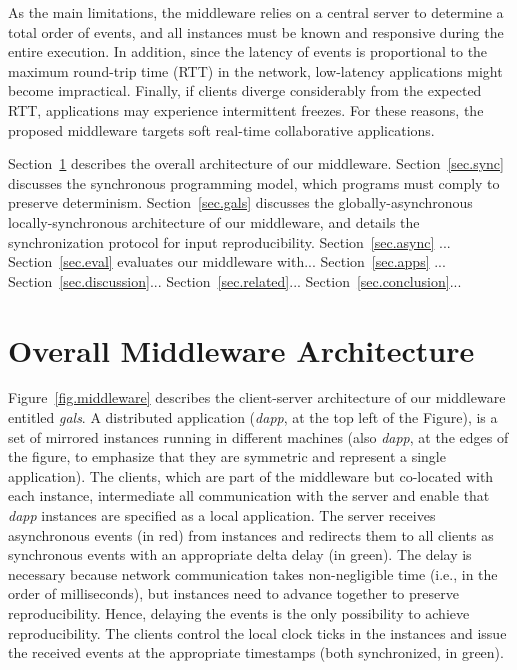 \documentclass[sigplan,screen]{acmart}
\newcommand{\dapp}{\emph{dapp}\xspace}
\begin{document}
As the main limitations, the middleware relies on a central server to determine
a total order of events, and all instances must be known and responsive during
the entire execution.
In addition, since the latency of events is proportional to the maximum
round-trip time (RTT) in the network, low-latency applications might become
impractical.
Finally, if clients diverge considerably from the expected RTT, applications
may experience intermittent freezes.
For these reasons, the proposed middleware targets soft real-time collaborative
applications.

Section~\ref{sec.arch} describes the overall architecture of our middleware.
Section~\ref{sec.sync} discusses the synchronous programming model, which
programs must comply to preserve determinism.
Section~\ref{sec.gals} discusses the globally-asynchronous locally-synchronous
architecture of our middleware, and details the synchronization protocol for
input reproducibility.
Section~\ref{sec.async} ...
Section~\ref{sec.eval} evaluates our middleware with...
Section~\ref{sec.apps} ... %
Section~\ref{sec.discussion}...
Section~\ref{sec.related}...
Section~\ref{sec.conclusion}...

\section{Overall Middleware Architecture}
\label{sec.arch}

Figure~\ref{fig.middleware} describes the client-server architecture of our
middleware entitled \emph{gals}.
A distributed application (\dapp, at the top left of the Figure), is a set of
mirrored instances running in different machines (also \dapp, at the edges of
the figure, to emphasize that they are symmetric and represent a single
application).
The clients, which are part of the middleware but co-located with each
instance, intermediate all communication with the server and enable that \dapp
instances are specified as a local application.
The server receives asynchronous events (in red) from instances and redirects
them to all clients as synchronous events with an appropriate delta delay (in
green).
The delay is necessary because network communication takes non-negligible time
(i.e., in the order of milliseconds), but instances need to advance together
to preserve reproducibility.
Hence, delaying the events is the only possibility to achieve reproducibility.
The clients control the local clock ticks in the instances and issue the
received events at the appropriate timestamps (both synchronized, in green).
\end{document}
